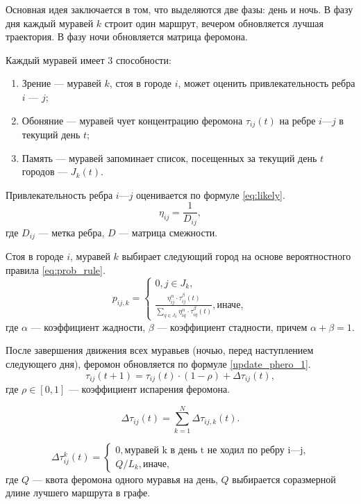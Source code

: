 Основная идея заключается в том, что выделяются две фазы: день и ночь. В фазу дня каждый муравей $k$ строит один маршрут, вечером обновляется лучшая траектория. В фазу ночи обновляется матрица феромона. 

Каждый муравей имеет 3 способности:
\begin{enumerate}
	\item Зрение --- муравей $k$, стоя в городе $i$, может оценить привлекательность ребра $i$ --- $j$;
	\item Обоняние --- муравей чует концентрацию феромона $\tau_{ij}(t)$ на ребре $i$---$j$ в текущий день $t$;
	\item Память --- муравей запоминает список, посещенных за текущий день $t$ городов --- $J_k(t)$.
\end{enumerate}

Привлекательность ребра $i$---$j$ оценивается по формуле \eqref{eq:likely}.
\begin{equation}
	\label{eq:likely}
	\eta_{ij} = \frac{1}{D_{ij}},
\end{equation}
где $D_{ij}$ --- метка ребра, $D$ --- матрица смежности.

Стоя в городе $i$, муравей $k$ выбирает следующий город на основе вероятностного правила \eqref{eq:prob_rule}.
\begin{equation}
	\label{eq:prob_rule}
	p_{ij, k} = \begin{cases}
		0, j \in J_k, \\
		\frac{\eta_{ij}^{\alpha}\cdot\tau_{ij}^{\beta}(t)}{\sum_{q\in J_k} \eta^\alpha_{iq}\cdot\tau^\beta_{iq}(t)}, \text{иначе},
	\end{cases}
\end{equation}
где $\alpha$ --- коэффициент жадности, $\beta$ --- коэффициент стадности, причем $\alpha + \beta = 1$.

После завершения движения всех муравьев (ночью, перед наступлением следующего дня), феромон обновляется по формуле \eqref{update_phero_1}.
\begin{equation}
	\label{update_phero_1}
	\tau_{ij}(t+1) = \tau_{ij}(t)\cdot(1-\rho) + \Delta \tau_{ij}(t),
\end{equation}
где $\rho \in [0, 1]$ --- коэффициент испарения феромона. 

\begin{equation}
	\label{update_phero_2}
	\Delta \tau_{ij}(t) = \sum_{k=1}^N \Delta \tau_{ij, k}(t).
\end{equation}

\begin{equation}
	\label{update_phero_3}
	\Delta\tau^k_{ij}(t) = \begin{cases}
		0, \textrm{муравей k в день t не ходил по ребру i---j,} \\
		Q/L_{k}, \textrm{иначе},
	\end{cases}
\end{equation}
где $Q$ --- квота феромона одного муравья на день, $Q$ выбирается соразмерной длине лучшего маршрута в графе.

